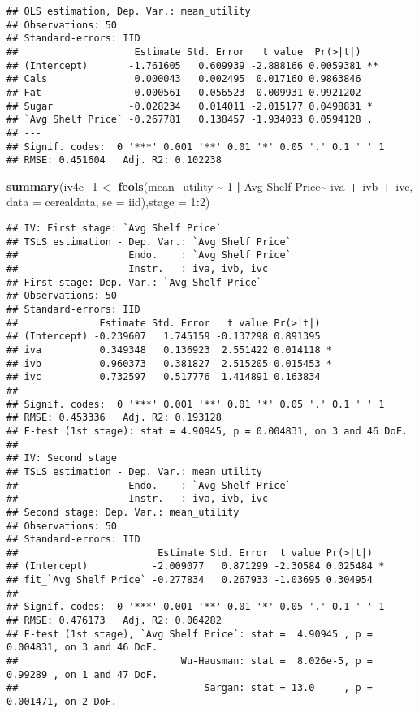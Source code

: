 \documentclass[
]{article}
\newenvironment{Shaded}{\begin{snugshade}}{\end{snugshade}}
\newcommand{\AttributeTok}[1]{\textcolor[rgb]{0.13,0.29,0.53}{#1}}
\newcommand{\DecValTok}[1]{\textcolor[rgb]{0.00,0.00,0.81}{#1}}
\newcommand{\FunctionTok}[1]{\textcolor[rgb]{0.13,0.29,0.53}{\textbf{#1}}}
\newcommand{\NormalTok}[1]{#1}
\newcommand{\OtherTok}[1]{\textcolor[rgb]{0.56,0.35,0.01}{#1}}
\newcommand{\SpecialCharTok}[1]{\textcolor[rgb]{0.81,0.36,0.00}{\textbf{#1}}}
\newcommand{\StringTok}[1]{\textcolor[rgb]{0.31,0.60,0.02}{#1}}
\begin{document}
\begin{verbatim}
## OLS estimation, Dep. Var.: mean_utility
## Observations: 50
## Standard-errors: IID 
##                    Estimate Std. Error   t value  Pr(>|t|)    
## (Intercept)       -1.761605   0.609939 -2.888166 0.0059381 ** 
## Cals               0.000043   0.002495  0.017160 0.9863846    
## Fat               -0.000561   0.056523 -0.009931 0.9921202    
## Sugar             -0.028234   0.014011 -2.015177 0.0498831 *  
## `Avg Shelf Price` -0.267781   0.138457 -1.934033 0.0594128 .  
## ---
## Signif. codes:  0 '***' 0.001 '**' 0.01 '*' 0.05 '.' 0.1 ' ' 1
## RMSE: 0.451604   Adj. R2: 0.102238
\end{verbatim}

\begin{Shaded}
\begin{Highlighting}[]
\FunctionTok{summary}\NormalTok{(iv4c\_1 }\OtherTok{\textless{}{-}} \FunctionTok{feols}\NormalTok{(mean\_utility }\SpecialCharTok{\textasciitilde{}} \DecValTok{1} \SpecialCharTok{|}  \StringTok{\textasciigrave{}}\AttributeTok{Avg Shelf Price}\StringTok{\textasciigrave{}}\SpecialCharTok{\textasciitilde{}}\NormalTok{ iva }\SpecialCharTok{+}\NormalTok{  ivb }\SpecialCharTok{+}\NormalTok{ ivc, }
                        \AttributeTok{data =}\NormalTok{ cerealdata, }\AttributeTok{se =} \StringTok{\textquotesingle{}iid\textquotesingle{}}\NormalTok{),}\AttributeTok{stage =} \DecValTok{1}\SpecialCharTok{:}\DecValTok{2}\NormalTok{)}
\end{Highlighting}
\end{Shaded}

\begin{verbatim}
## IV: First stage: `Avg Shelf Price`
## TSLS estimation - Dep. Var.: `Avg Shelf Price`
##                   Endo.    : `Avg Shelf Price`
##                   Instr.   : iva, ivb, ivc
## First stage: Dep. Var.: `Avg Shelf Price`
## Observations: 50
## Standard-errors: IID 
##              Estimate Std. Error   t value Pr(>|t|)    
## (Intercept) -0.239607   1.745159 -0.137298 0.891395    
## iva          0.349348   0.136923  2.551422 0.014118 *  
## ivb          0.960373   0.381827  2.515205 0.015453 *  
## ivc          0.732597   0.517776  1.414891 0.163834    
## ---
## Signif. codes:  0 '***' 0.001 '**' 0.01 '*' 0.05 '.' 0.1 ' ' 1
## RMSE: 0.453336   Adj. R2: 0.193128
## F-test (1st stage): stat = 4.90945, p = 0.004831, on 3 and 46 DoF.
## 
## IV: Second stage
## TSLS estimation - Dep. Var.: mean_utility
##                   Endo.    : `Avg Shelf Price`
##                   Instr.   : iva, ivb, ivc
## Second stage: Dep. Var.: mean_utility
## Observations: 50
## Standard-errors: IID 
##                        Estimate Std. Error  t value Pr(>|t|)    
## (Intercept)           -2.009077   0.871299 -2.30584 0.025484 *  
## fit_`Avg Shelf Price` -0.277834   0.267933 -1.03695 0.304954    
## ---
## Signif. codes:  0 '***' 0.001 '**' 0.01 '*' 0.05 '.' 0.1 ' ' 1
## RMSE: 0.476173   Adj. R2: 0.064282
## F-test (1st stage), `Avg Shelf Price`: stat =  4.90945 , p = 0.004831, on 3 and 46 DoF.
##                            Wu-Hausman: stat =  8.026e-5, p = 0.99289 , on 1 and 47 DoF.
##                                Sargan: stat = 13.0     , p = 0.001471, on 2 DoF.
\end{verbatim}
\end{document}
